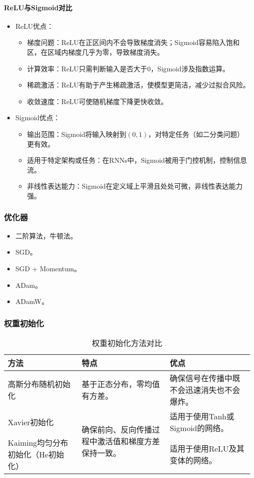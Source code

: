 \documentclass[
12pt, %
a4paper, 
oneside, %
headinclude,footinclude, %
]{scrartcl}
\begin{document}
\paragraph{ReLU与Sigmoid对比}
\begin{itemize}
\item ReLU优点：
\begin{itemize}
\item 梯度问题：ReLU在正区间内不会导致梯度消失；Sigmoid容易陷入饱和区，在区域内梯度几乎为零，导致梯度消失。
\item 计算效率：ReLU只需判断输入是否大于$ 0 $，Sigmoid涉及指数运算。
\item 稀疏激活：ReLU有助于产生稀疏激活，使模型更简洁，减少过拟合风险。
\item 收敛速度：ReLU可使随机梯度下降更快收敛。
\end{itemize}
\item Sigmoid优点：
\begin{itemize}
\item 输出范围：Sigmoid将输入映射到$ (0, 1) $，对特定任务（如二分类问题）更有效。
\item 适用于特定架构或任务：在RNNs中，Sigmoid被用于门控机制，控制信息流。
\item 非线性表达能力：Sigmoid在定义域上平滑且处处可微，非线性表达能力强。
\end{itemize}
\end{itemize}
\subsubsection[优化器]{优化器}
\begin{itemize}
\item 二阶算法，牛顿法。
\item SGD。
\item SGD + Momentum。
\item ADam。
\item ADamW。
\end{itemize}
\subsubsection[权重初始化]{权重初始化}
\begin{table}[H]
\centering
\begin{tabular}{|p{3cm}|p{5cm}|p{6cm}|}
\hline
方法 & 特点 & 优点 \\
\hline
高斯分布随机初始化 & 基于正态分布，零均值有方差。 & 确保信号在传播中既不会迅速消失也不会爆炸。 \\
\hline
Xavier初始化 & \multirow{2}{5cm}{确保前向、反向传播过程中激活值和梯度方差保持一致。} & 适用于使用Tanh或Sigmoid的网络。 \\
\cline{1-1}\cline{3-3}
Kaiming均匀分布初始化（He初始化） & & 适用于使用ReLU及其变体的网络。 \\
\hline
\end{tabular}
\caption{权重初始化方法对比}
\end{table}
\end{document}
